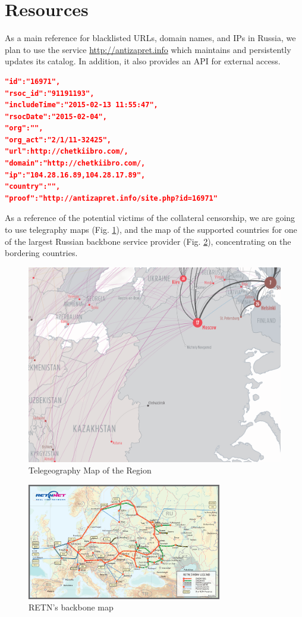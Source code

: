 \documentclass[conference]{IEEEtran}
\begin{document}
\section{Resources}
\indent As a main reference for blacklisted URLs, domain names, and IPs in Russia, we plan to use the service \url{http://antizapret.info} which maintains and persistently updates its catalog. 
In addition, it also provides an API for external access. 

\begin{lstlisting}[language=json,firstnumber=1,caption={An example of the possible output from requesting
\url{http://api.antizapret.info/all.php?type=json}}, label=listing1, frame=single] 
"id":"16971",
"rsoc_id":"91191193",
"includeTime":"2015-02-13 11:55:47",
"rsocDate":"2015-02-04",
"org":"",
"org_act":"2/1/11-32425",
"url":http://chetkiibro.com/,
"domain":"http://chetkiibro.com/,
"ip":"104.28.16.89,104.28.17.89",
"country":"",
"proof":"http://antizapret.info/site.php?id=16971"
\end{lstlisting}
As a reference of the potential victims of the collateral censorship, we are going to use telegraphy maps (Fig. \ref{fig:fig3}), and the map of the supported countries for one of the largest Russian backbone service provider (Fig. \ref{fig:fig2}), concentrating on the bordering countries. 

\begin{figure}[H]
\centering
\includegraphics[width=.45\textwidth]{routeMap.png}
\caption{Telegeography Map of the Region \label{teleG}}
\label{fig:fig3}
\end{figure}

\begin{figure}[H]
\centering
\includegraphics[width=85mm]{figure2.png}
\caption{RETN's backbone map \label{RetnMap}}
\label{fig:fig2}
\end{figure}
\end{document}
